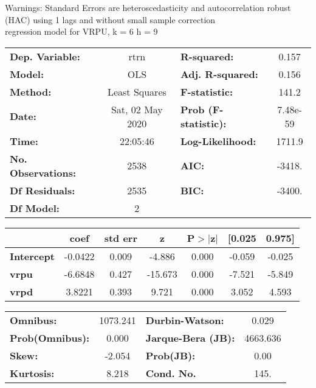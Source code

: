 Warnings: \newline
 [1] Standard Errors are heteroscedasticity and autocorrelation robust (HAC) using 1 lags and without small sample correction\\ 

regression model for VRPU, k = 6 h = 9\begin{center}
\begin{tabular}{lclc}
\toprule
\textbf{Dep. Variable:}    &       rtrn       & \textbf{  R-squared:         } &     0.157   \\
\textbf{Model:}            &       OLS        & \textbf{  Adj. R-squared:    } &     0.156   \\
\textbf{Method:}           &  Least Squares   & \textbf{  F-statistic:       } &     141.2   \\
\textbf{Date:}             & Sat, 02 May 2020 & \textbf{  Prob (F-statistic):} &  7.48e-59   \\
\textbf{Time:}             &     22:05:46     & \textbf{  Log-Likelihood:    } &    1711.9   \\
\textbf{No. Observations:} &        2538      & \textbf{  AIC:               } &    -3418.   \\
\textbf{Df Residuals:}     &        2535      & \textbf{  BIC:               } &    -3400.   \\
\textbf{Df Model:}         &           2      & \textbf{                     } &             \\
\bottomrule
\end{tabular}
\begin{tabular}{lcccccc}
                   & \textbf{coef} & \textbf{std err} & \textbf{z} & \textbf{P$> |$z$|$} & \textbf{[0.025} & \textbf{0.975]}  \\
\midrule
\textbf{Intercept} &      -0.0422  &        0.009     &    -4.886  &         0.000        &       -0.059    &       -0.025     \\
\textbf{vrpu}      &      -6.6848  &        0.427     &   -15.673  &         0.000        &       -7.521    &       -5.849     \\
\textbf{vrpd}      &       3.8221  &        0.393     &     9.721  &         0.000        &        3.052    &        4.593     \\
\bottomrule
\end{tabular}
\begin{tabular}{lclc}
\textbf{Omnibus:}       & 1073.241 & \textbf{  Durbin-Watson:     } &    0.029  \\
\textbf{Prob(Omnibus):} &   0.000  & \textbf{  Jarque-Bera (JB):  } & 4663.636  \\
\textbf{Skew:}          &  -2.054  & \textbf{  Prob(JB):          } &     0.00  \\
\textbf{Kurtosis:}      &   8.218  & \textbf{  Cond. No.          } &     145.  \\
\bottomrule
\end{tabular}
\end{center}

